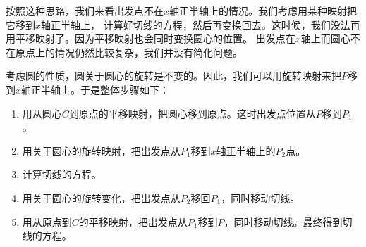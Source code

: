 \documentclass[12pt,UTF8,fontset=none]{ctexbook}
\begin{document}
按照这种思路，我们来看出发点不在$x$轴正半轴上的情况。我们考虑用某种映射把它移到$x$轴正半轴上，
计算好切线的方程，然后再变换回去。这时候，我们没法再用平移映射了。因为平移映射也会同时变换圆心的位置。
出发点在$x$轴上而圆心不在原点上的情况仍然比较复杂，我们并没有简化问题。

考虑圆的性质，圆关于圆心的旋转是不变的。因此，我们可以用旋转映射来把$P$移到$x$轴正半轴上。于是整体步骤如下：

\begin{enumerate}
    \item 用从圆心$C$到原点的平移映射，把圆心移到原点。这时出发点位置从$P$移到$P_1$。
    \item 用关于圆心的旋转映射，把出发点从$P_1$移到$x$轴正半轴上的$P_2$点。
    \item 计算切线的方程。
    \item 用关于圆心的旋转变化，把出发点从$P_2$移回$P_1$，同时移动切线。
    \item 用从原点到$C$的平移映射，把出发点从$P_1$移到$P$，同时移动切线。最终得到切线的方程。
\end{enumerate}
\end{document}
